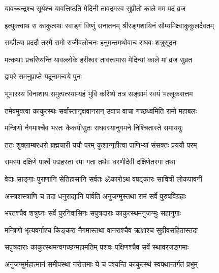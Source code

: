 \twolineshloka
{यावच्चन्द्रश्च सूर्यश्च यावत्तिष्ठति मेदिनी}
{तावद्रमस्व सुप्रीतो काले मम पदं व्रज}%


\twolineshloka
{इत्युक्त्वाथ स काकुत्स्थः स्वाड्गं विष्णुं सनातनम्}
{श्रीरङ्गशायिनं सौम्यमिक्ष्वाकुकुलदैवतम्}%

\twolineshloka
{सम्प्रीत्या प्रददौ तस्मै रामो राजीवलोचनः}
{हनुमन्तमथोवाच राघवः शत्रुसूदनः}%


\twolineshloka
{मत्कथाः प्रचरिष्यन्ति यावल्लोके हरीश्वर}
{तावत्त्वमास मेदिन्यां काले मां व्रज सुव्रत}%



\onelineshloka
{द्वापरे समनुप्राप्ते यदूनामन्वये पुनः}%

\twolineshloka
{भूभारस्य विनाशाय समुत्पत्स्याम्यहं भुवि}
{करिष्ये तत्र सङ्ग्रामं स्वयं भल्लूकसत्तम}%


\twolineshloka
{तमेवमुक्त्वा काकुत्स्थः सर्वांस्तानृक्षवानरान्}
{उवाच वाचा गच्छध्वमिति रामो महाबलः}%

\twolineshloka
{मन्त्रिणो नैगमाश्चैव भरतः कैकयीसुतः}
{राघवस्यानुगमने निश्चितास्ते समाययुः}%

\twolineshloka
{ततः शुक्लाम्बरधरो ब्रह्मचारी ययौ परम्}
{कुशान्गृहीत्वा पाणिभ्यां संसक्तः प्रययौ परम्}%

\twolineshloka
{रामस्य दक्षिणे पार्श्वे पद्महस्ता रमा गता}
{तथैव धरणीदेवी दक्षिणेतरगा तथा}%

\twolineshloka
{वेदाः साङ्गाः पुराणानि सेतिहासानि सर्वतः}
{ॐकारोऽथ वषट्कारः सावित्री लोकपावनी}%

\twolineshloka
{अस्त्रशस्त्राणि च तदा धनुराद्यानि पार्वति}
{अनुजग्मुस्तथा रामं सर्वे पुरुषविग्रहाः}%

\twolineshloka
{भरतश्चैव शत्रुघ्नः सर्वे पुरनिवासिनः}
{सपुत्रदाराः काकुत्स्थमनुजग्मुः सहानुगाः}%

\twolineshloka
{मन्त्रिणो भृत्यवर्गाश्च किङ्करा नैगमास्तथा}
{वानराश्चैव ऋक्षाश्च सुग्रीवसहितास्तदा}%

\twolineshloka
{सपुत्रदाराः काकुत्स्थमन्वगच्छन्महामतिम्}
{पशवः पक्षिणश्चैव सर्वे स्थावरजङ्गमाः}%

\twolineshloka
{अनुजग्मुर्महात्मानं समीपस्था नरोत्तमाः}
{ये च पश्यन्ति काकुत्स्थं स्वपथान्तर्गतं प्रभुम्}%

